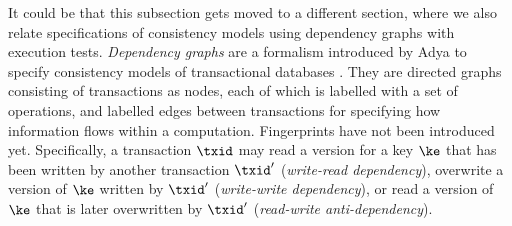 \ac{It could be that this subsection gets moved to a different section, where 
we also relate specifications of consistency models using dependency graphs
with execution tests.}
\emph{Dependency graphs} are a formalism  introduced by Adya to specify 
consistency models of transactional databases \cite{adya}. They are directed graphs consisting of transactions as nodes, 
each of which is labelled with a set of operations, and labelled edges 
between transactions for specifying how information flows within a computation. 
\ac{Fingerprints have not been introduced yet.}
Specifically, a transaction $\txid$ may read a version for a key $\ke$ that has been written by another transaction $\txid'$ 
(\emph{write-read dependency}), overwrite a version of $\ke$ written by $\txid'$ (\emph{write-write dependency}), or 
read a version of $\ke$ that is later overwritten by $\txid'$ (\emph{read-write anti-dependency}).
